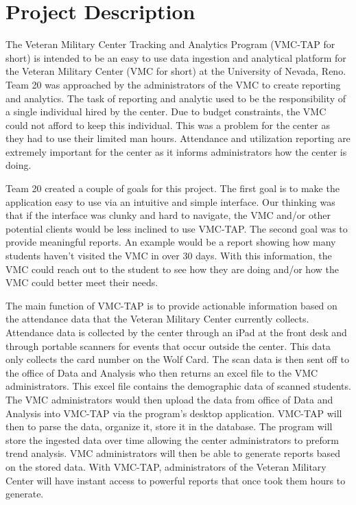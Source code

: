\section{Project Description}
\label{sect:project_description}

The Veteran Military Center Tracking and Analytics Program (VMC-TAP for short) is intended to be an easy to use data ingestion and analytical platform for the Veteran Military Center (VMC for short) at the University of Nevada, Reno. Team 20  was approached by the administrators of the VMC to create reporting and analytics. The task of reporting and analytic used to be the responsibility of a single individual hired by the center. Due to budget constraints, the VMC could not afford to keep this individual. This was a problem for the center as they had to use their limited man hours. Attendance and utilization reporting are extremely important for the center as it informs administrators how the center is doing. 

Team 20 created a couple of goals for this project. The first goal is to make the application easy to use via an intuitive and simple interface. Our thinking was that if the interface was clunky and hard to navigate, the VMC and/or other potential clients would be less inclined to use VMC-TAP. The second goal was to provide meaningful reports. An example would be a report showing how many students haven’t visited the VMC in over 30 days. With this information, the VMC could reach out to the student to see how they are doing and/or how the VMC could better meet their needs. 
	
The main function of VMC-TAP is to provide actionable information based on the attendance data that the Veteran Military Center currently collects. Attendance data is collected by the center through an iPad at the front desk and through portable scanners for events that occur outside the center. This data only collects the card number on the Wolf Card. The scan data is then sent off to the office of Data and Analysis who then returns an excel file to the VMC administrators. This excel file  contains the demographic data of scanned students. The VMC administrators would then upload the data from office of Data and Analysis into VMC-TAP via the program’s desktop application. VMC-TAP will then to parse the data, organize it, store it in the database. The program will store the ingested data over time allowing the center administrators to preform trend analysis. VMC administrators will then be able to generate reports based on the stored data. With VMC-TAP, administrators of the Veteran Military Center will have instant access to powerful reports that once took them hours to generate.

